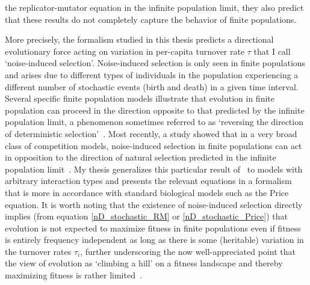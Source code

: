 the replicator-mutator equation in the infinite population limit, they also predict that these results do not completely capture the behavior of finite populations.

More precisely, the formalism studied in this thesis predicts a directional evolutionary force acting on variation in per-capita turnover rate $\tau$ that I call `noise-induced selection'. Noise-induced selection is only seen in finite populations and arises due to different types of individuals in the population experiencing a different number of stochastic events (birth and death) in a given time interval. Several specific finite population models illustrate that evolution in finite population can proceed in the direction opposite to that predicted by the infinite population limit, a phenomenon sometimes referred to as `reversing the direction of deterministic selection'~\citep{parsons_consequences_2010, houchmandzadeh_fluctuation_2015, behar_fluctuations-induced_2016, constable_demographic_2016,mcleod_social_2019}. Most recently, a study showed that in a very broad class of competition models, noise-induced selection in finite populations can act in opposition to the direction of natural selection predicted in the infinite population limit~\citep{mazzolini_universality_2022}. My thesis generalizes this particular result of~\cite{mazzolini_universality_2022} to models with arbitrary interaction types and presents the relevant equations in a formalism that is more in accordance with standard biological models such as the Price equation. It is worth noting that the existence of noise-induced selection directly implies (from equation \eqref{nD_stochastic_RM} or \eqref{nD_stochastic_Price}) that evolution is not expected to maximize fitness in finite populations even if fitness is entirely frequency independent as long as there is some (heritable) variation in the turnover rates $\tau_i$, further underscoring the now well-appreciated point that the view of evolution as `climbing a hill' on a fitness landscape and thereby maximizing fitness is rather limited~\citep{grodwohl_theory_2017}.

